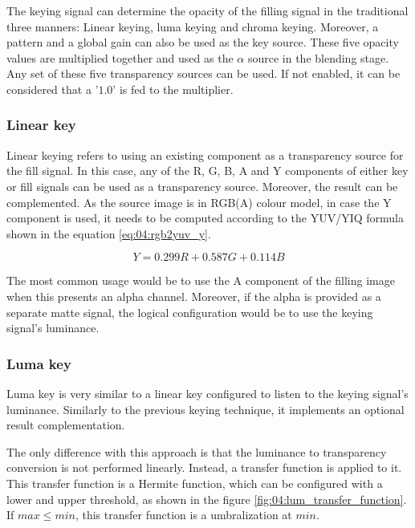 \documentclass[../main.tex]{subfiles}
\begin{document}
The keying signal can determine the opacity of the filling signal in the traditional three manners: Linear keying, luma keying and chroma keying. Moreover, a pattern and a global gain can also be used as the key source. These five opacity values are multiplied together and used as the $\alpha$ source in the blending stage. Any set of these five transparency sources can be used. If not enabled, it can be considered that a '$1.0$' is fed to the multiplier.\newline

\subsubsection{Linear key}
Linear keying refers to using an existing component as a transparency source for the fill signal. In this case, any of the R, G, B, A and Y components of either key or fill signals can be used as a transparency source. Moreover, the result can be complemented. As the source image is in RGB(A) colour model, in case the Y component is used, it needs to be computed according to the YUV/YIQ formula shown in the equation \eqref{eq:04:rgb2yuv_y}.\newline

\begin{equation}\label{eq:04:rgb2yuv_y}
    Y = 0.299R + 0.587G + 0.114B
\end{equation}

The most common usage would be to use the A component of the filling image when this presents an alpha channel. Moreover, if the alpha is  provided as a separate matte signal, the logical configuration would be to use the keying signal's luminance.\newline

\subsubsection{Luma key}
Luma key is very similar to a linear key configured to listen to the keying signal's luminance. Similarly to the previous keying technique, it implements an optional result complementation.\newline

The only difference with this approach is that the luminance to transparency conversion is not performed linearly. Instead, a transfer function is applied to it. This transfer function is a Hermite function, which can be configured with a lower and upper threshold, as shown in the figure \ref{fig:04:lum_transfer_function}. If $max \leq min$, this transfer function is a umbralization at $min$.\newline
\end{document}
